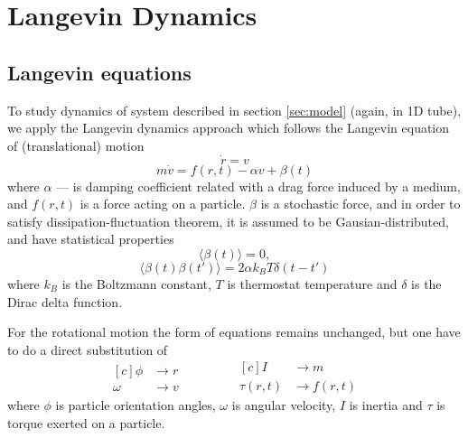\section{Langevin Dynamics}
\label{sec:langevin_dynamics}

\subsection{Langevin equations}
\label{subsec:langevin_equations}
To study dynamics of system described in section \ref{sec:model} (again, in 1D tube), we apply the Langevin dynamics approach which follows the Langevin equation of (translational) motion
\begin{equation}
\label{eq:langevin_theory_1}
	\dot{r} = v
\end{equation}
\begin{equation}
\label{eq:langevin_theory_2}
	m \dot{v} = f(r, t) - \alpha v + \beta(t)
\end{equation}
where $\alpha$ --- is damping coefficient related with a drag force induced by a medium, and $f(r, t)$ is a force acting on a particle. $\beta$ is a stochastic force, and in order to satisfy dissipation-fluctuation theorem, it is assumed to be Gausian-distributed, and have statistical properties
\begin{equation}
\langle\beta(t)\rangle = 0,
\end{equation}
\begin{equation}
\langle\beta(t)\beta(t')\rangle = 2 \alpha k_B T\delta(t - t')
\end{equation}
where $k_B$ is the Boltzmann constant, $T$ is thermostat temperature and $\delta$ is the Dirac delta function.

For the rotational motion the form of equations remains unchanged, but one have to do a direct substitution of 
\begin{equation}
\label{eq:rotation_translation_substitution}
	\begin{aligned}[c]
		\phi &\rightarrow r        \\
		\omega &\rightarrow v 
	\end{aligned}
	\qquad
	\qquad
	\begin{aligned}[c]
		I &\rightarrow m        \\
		\tau(r, t) &\rightarrow f(r, t)
	\end{aligned}
\end{equation}
where $\phi$ is particle orientation angles, $\omega$ is angular velocity, $I$ is inertia and $\tau$ is torque exerted on a particle.


